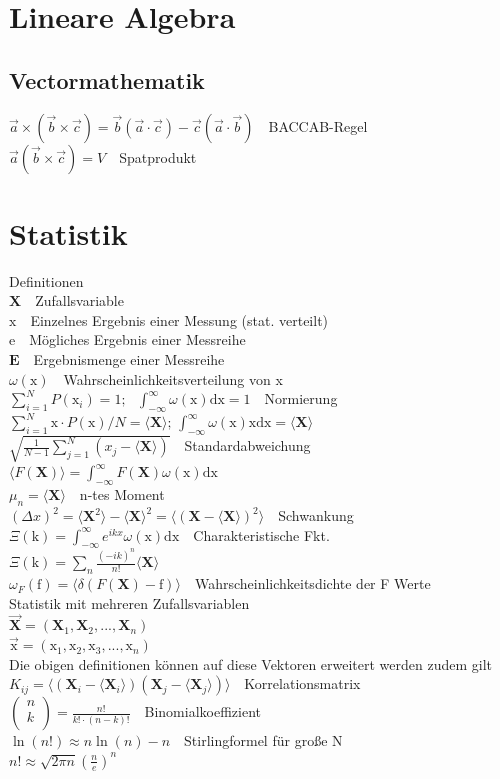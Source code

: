 \documentclass[8pt,a4paper]{extarticle}
\newcommand{\frml}[2]{$#1$~\hfill~#2\\}
\newcommand{\stat}[1]{\mathrm{#1}}
\newcommand{\statvar}[1]{\mathbf{#1}}
\begin{document}
\begin{multicols}{3}
\section{Lineare Algebra}
\subsection{Vectormathematik}
\frml{\vec{a}\times(\vec{b}\times\vec{c}) = \vec{b}(\vec{a}\cdot\vec{c})-\vec{c}(\vec{a}\cdot\vec{b})}{BACCAB-Regel}
\frml{\vec{a}(\vec{b}\times\vec{c}) = V }{Spatprodukt}
\section{Statistik}
Definitionen \\
\frml{\mathbf{X}}{Zufallsvariable}
\frml{\text{x}}{Einzelnes Ergebnis einer Messung (stat. verteilt)}
\frml{\text{e}}{M\"ogliches Ergebnis einer Messreihe}
\frml{\mathbf{E}}{Ergebnismenge einer Messreihe}
\frml{\omega(\stat{x})}{Wahrscheinlichkeitsverteilung von x}
\frml{\sum_{i=1}^N P(\stat{x}_i)=1;\text{ }\int_{-\infty}^\infty \omega(\stat{x}) \mathrm{dx} = 1}{Normierung}
\frml{\sum_{i=1}^N \stat{x}\cdot P(\stat{x})/N=\langle\statvar{X}\rangle\text{; }\int_{-\infty}^\infty \omega(\stat{x})\stat{x} \mathrm{dx}=\langle\statvar{X}\rangle}{}
\frml{\sqrt{\frac{1}{N-1}\sum_{j=1}^N(x_j-\langle\statvar{X}\rangle)}}{Standardabweichung}
\frml{\langle F(\statvar{X})\rangle = \int_{-\infty}^\infty F(\statvar{X})\omega(\stat{x})\mathrm{dx}}{}
\frml{\mu_n = \langle\statvar{X}\rangle}{n-tes Moment}
\frml{(\Delta x)^2 = \langle\statvar{X}^2\rangle-\langle\statvar{X}\rangle^2 = \langle(\statvar{X}-\langle\statvar{X}\rangle)^2\rangle}{Schwankung}
\frml{\Xi(\stat{k}) = \int_{-\infty}^\infty e^{ikx} \omega(\stat{x})\mathrm{d}\stat{x}}{Charakteristische Fkt.}
\frml{\Xi(\stat{k}) = \sum_n \frac{(-ik)^n}{n!}\langle\statvar{X}\rangle}{}
\frml{\omega_F(\stat{f}) = \langle\delta(F(\statvar{X})-\stat{f})\rangle}{Wahrscheinlichkeitsdichte der F Werte}
Statistik mit mehreren Zufallsvariablen \\
\frml{\vec{\statvar{X}} = (\statvar{X}_1,\statvar{X}_2, ..., \statvar{X}_n)}{}
\frml{\vec{\stat{x}} = (\stat{x}_1, \stat{x}_2, \stat{x}_3,..., \stat{x}_n)}{}
Die obigen definitionen k\"onnen auf diese Vektoren erweitert werden zudem gilt\\
\frml{K_{ij} = \langle(\statvar{X}_i-\langle\statvar{X}_i\rangle)(\statvar{X}_j-\langle\statvar{X}_j\rangle)\rangle}{Korrelationsmatrix}
\frml{\begin{pmatrix}n \\ k\\ \end{pmatrix} = \frac{n!}{k!\cdot(n-k)!}}{Binomialkoeffizient}
\frml{\ln(n!) \approx n\ln(n)-n}{Stirlingformel f\"ur gro{\ss}e N}
\frml{n! \approx \sqrt{2\pi n}\left(\frac{n}{e}\right)^n}{}

\end{multicols}
\end{document}
